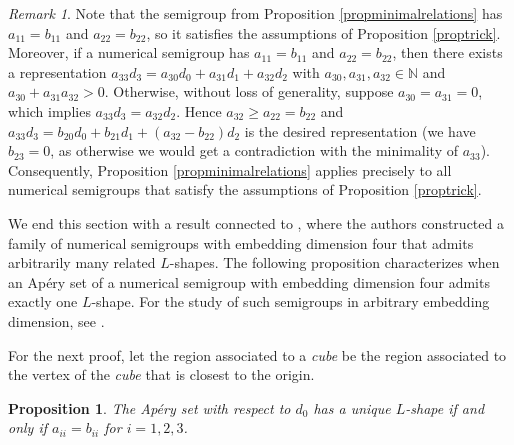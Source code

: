 \documentclass[12pt]{article}
\newtheorem{prop}[thm]{Proposition}
\theoremstyle{remark}
\newtheorem{remark}[thm]{Remark}
\begin{document}
\begin{remark}\label{remark_propminimalrelations}
    Note that the semigroup from Proposition \ref{propminimalrelations} has $a_{11} = b_{11}$ and $a_{22}=b_{22}$, so it satisfies the assumptions of Proposition \ref{proptrick}. Moreover, if a numerical semigroup has $a_{11}=b_{11}$ and $a_{22}=b_{22}$, then there exists a representation $a_{33}d_3 = a_{30}d_0 + a_{31}d_1 + a_{32}d_2$ with $a_{30}, a_{31}, a_{32} \in \mathbb{N}$ and $a_{30} + a_{31}a_{32} > 0$. Otherwise, without loss of generality, suppose $a_{30} = a_{31} = 0$, which implies $a_{33}d_3 = a_{32}d_2$. Hence $a_{32} \geq a_{22} = b_{22}$ and $a_{33}d_3 = b_{20}d_0 + b_{21}d_1 + (a_{32}-b_{22})d_2$ is the desired representation (we have $b_{23} = 0$, as otherwise we would get a contradiction with the minimality of $a_{33}$).
    Consequently, Proposition \ref{propminimalrelations} applies precisely to all numerical semigroups that satisfy the assumptions of Proposition \ref{proptrick}.
\end{remark}



We end this section with a result connected to \cite{AGUILOGOST2015}, where the authors constructed a family of numerical semigroups with embedding dimension four that admits arbitrarily many related $L$-shapes. The following proposition characterizes when an Ap{\'e}ry set of a numerical semigroup with embedding dimension four admits exactly one $L$-shape. For the study of such semigroups in arbitrary embedding dimension, see \cite{Rosales2000}.

For the next proof, let the region associated to a \emph{cube} be the region associated to the vertex of the \emph{cube} that is closest to the origin.


\begin{prop}\label{propL-shapes}
    The Ap{\'e}ry set with respect to $d_0$ has a unique $L$-shape if and only if $a_{ii}=b_{ii}$ for $i=1,2,3$.
\end{prop}
\end{document}
